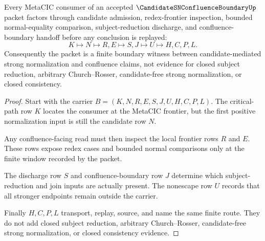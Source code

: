 \begin{theorem}
\label{thm:candidate-sn-confluence-boundary-route}
Every MetaCIC consumer of an accepted $\CandidateSNConfluenceBoundaryUp$ packet factors through candidate admission, redex-frontier inspection, bounded normal-equality comparison, subject-reduction discharge, and confluence-boundary handoff before any conclusion is replayed:
$$
K \longmapsto N \longmapsto R,E \longmapsto S,J \longmapsto U \longmapsto H,C,P,L .
$$
Consequently the packet is a finite boundary witness between candidate-mediated strong normalization and confluence claims, not evidence for closed subject reduction, arbitrary Church--Rosser, candidate-free strong normalization, or closed consistency.
\end{theorem}
\begin{proof}
Start with the carrier $B=(K,N,R,E,S,J,U,H,C,P,L)$. The critical-path row $K$ locates the consumer at the MetaCIC frontier, but the first positive normalization input is still the candidate row $N$.

Any confluence-facing read must then inspect the local frontier rows $R$ and $E$. These rows expose redex cases and bounded normal comparisons only at the finite window recorded by the packet.

The discharge row $S$ and confluence-boundary row $J$ determine which subject-reduction and join inputs are actually present. The nonescape row $U$ records that all stronger endpoints remain outside the carrier.

Finally $H,C,P,L$ transport, replay, source, and name the same finite route. They do not add closed subject reduction, arbitrary Church--Rosser, candidate-free strong normalization, or closed consistency evidence.
\end{proof}

